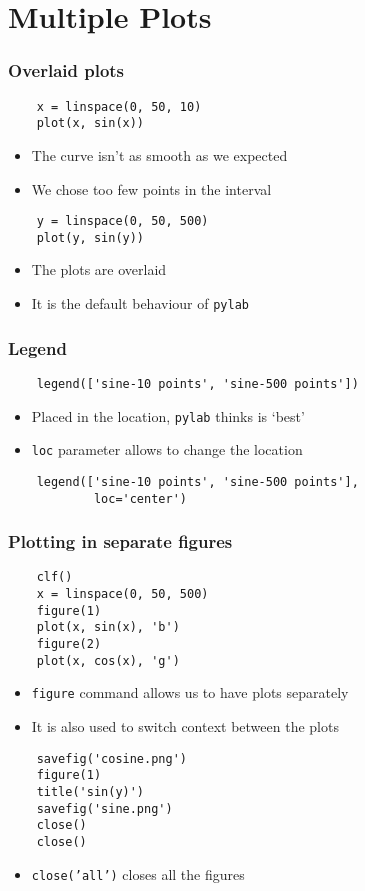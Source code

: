 \section{Multiple Plots}

\begin{frame}[fragile]
  \frametitle{Overlaid plots}
  \begin{lstlisting}
    x = linspace(0, 50, 10)
    plot(x, sin(x))
  \end{lstlisting}
  \begin{itemize}
  \item The curve isn't as smooth as we expected
  \item We chose too few points in the interval
  \end{itemize}
  \begin{lstlisting}
    y = linspace(0, 50, 500)
    plot(y, sin(y))
  \end{lstlisting}
  \begin{itemize}
  \item The plots are overlaid
  \item It is the default behaviour of \texttt{pylab}
  \end{itemize}
\end{frame}

\begin{frame}[fragile]
  \frametitle{Legend}
  \begin{lstlisting}
    legend(['sine-10 points', 'sine-500 points'])
  \end{lstlisting}
  \begin{itemize}
  \item Placed in the location, \texttt{pylab} thinks is `best'
  \item \texttt{loc} parameter allows to change the location
  \end{itemize}
  \begin{lstlisting}
    legend(['sine-10 points', 'sine-500 points'], 
            loc='center')
  \end{lstlisting}
\end{frame}

\begin{frame}[fragile]
  \frametitle{Plotting in separate figures}
  \begin{lstlisting}
    clf()
    x = linspace(0, 50, 500)
    figure(1)
    plot(x, sin(x), 'b')
    figure(2)
    plot(x, cos(x), 'g')
  \end{lstlisting}
  \begin{itemize}
  \item \texttt{figure} command allows us to have plots separately
  \item It is also used to switch context between the plots
  \end{itemize}
  \begin{lstlisting}
    savefig('cosine.png')
    figure(1)
    title('sin(y)')
    savefig('sine.png')
    close()
    close()
  \end{lstlisting}
  \begin{itemize}
  \item \texttt{close('all')} closes all the figures
  \end{itemize}
\end{frame}


